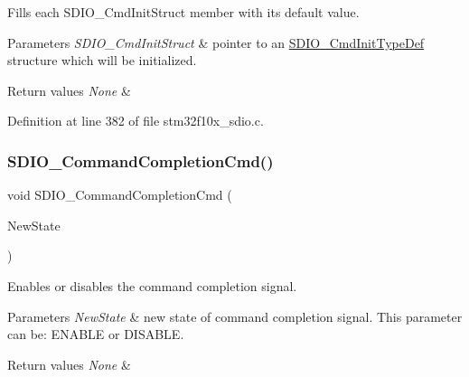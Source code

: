 Fills each S\+D\+I\+O\+\_\+\+Cmd\+Init\+Struct member with its default value. 


\begin{DoxyParams}{Parameters}
{\em S\+D\+I\+O\+\_\+\+Cmd\+Init\+Struct} & pointer to an \hyperlink{struct_s_d_i_o___cmd_init_type_def}{S\+D\+I\+O\+\_\+\+Cmd\+Init\+Type\+Def} structure which will be initialized. \\
\hline
\end{DoxyParams}

\begin{DoxyRetVals}{Return values}
{\em None} & \\
\hline
\end{DoxyRetVals}


Definition at line 382 of file stm32f10x\+\_\+sdio.\+c.

\mbox{\label{group___s_d_i_o___private___functions_ga1bbe98c629812bc62121d9c8b2c5e21b}} 
\subsubsection{\texorpdfstring{S\+D\+I\+O\+\_\+\+Command\+Completion\+Cmd()}{SDIO\_CommandCompletionCmd()}}
{\footnotesize\ttfamily void S\+D\+I\+O\+\_\+\+Command\+Completion\+Cmd (\begin{DoxyParamCaption}\item[{\hyperlink{group___exported__types_gac9a7e9a35d2513ec15c3b537aaa4fba1}{Functional\+State}}]{New\+State }\end{DoxyParamCaption})}



Enables or disables the command completion signal. 


\begin{DoxyParams}{Parameters}
{\em New\+State} & new state of command completion signal. This parameter can be\+: E\+N\+A\+B\+LE or D\+I\+S\+A\+B\+LE. \\
\hline
\end{DoxyParams}

\begin{DoxyRetVals}{Return values}
{\em None} & \\
\hline
\end{DoxyRetVals}


